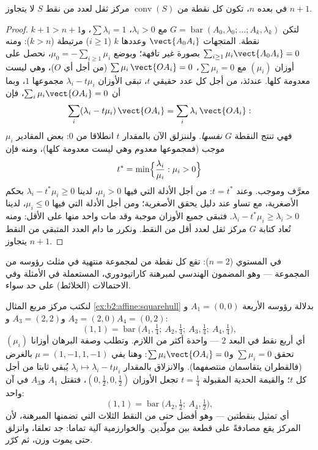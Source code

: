 \begin{theorem}[كاراتيودوري]\label{thm:b2:affine:caratheodory}
في  بعده $n$، تكون كل نقطة من $\operatorname{conv}(S)$ مركز ثقل لعدد من
نقط $S$ لا يتجاوز $n + 1$.
\end{theorem}

\begin{proof}
لتكن $G = \operatorname{bar}(A_0, \lambda_0; \dots; A_k, \lambda_k)$ مع $\lambda_i > 0$، $\sum\lambda_i = 1$، و$k + 1 > n + 1$ نقطة. المتجهات $\vect{A_0A_i}$ وعددها
$k$ ($i \geq 1$) مرتبطة ($k > n$): ومنه $\sum_{i\geq1}\mu_i \vect{A_0A_i} = 0$ بصورة غير تافهة؛
وبوضع $\mu_0 = -\sum_{i\geq1}\mu_i$، نحصل على أوزان $(\mu_i)$ مع $\sum\mu_i = 0$، $\sum \mu_i\,\vect{OA_i} = 0$ (من أجل أي
$O$)، وهي ليست معدومة كلها. عندئذ، من أجل كل عدد حقيقي $t$،
تبقى الأوزان $\lambda_i - t\mu_i$ مجموعها $1$، وبما أن $\sum_i\mu_i\vect{OA_i} = 0$، فإن
\[
\sum_i(\lambda_i - t\mu_i)\,\vect{OA_i}
= \sum_i\lambda_i\,\vect{OA_i} :
\]
فهي تنتج النقطة $G$ \emph{نفسها}. ولننزلق الآن بالمقدار $t$
انطلاقا من $0$: بعض المقادير $\mu_i$ موجب (فمجموعها معدوم وهي
ليست معدومة كلها)، ومنه فإن
\[
t^* = \min\Bigl\{\frac{\lambda_i}{\mu_i} : \mu_i > 0\Bigr\}
\]
معرَّف وموجب. وعند $t = t^*$: من أجل الأدلة التي فيها $\mu_i > 0$، لدينا
$\lambda_i - t^*\mu_i \geq 0$ بحكم الأصغرية، مع تساو عند دليل يحقق الأصغرية؛ ومن أجل الأدلة
التي فيها $\mu_i
\leq 0$، لدينا $\lambda_i - t^*\mu_i \geq \lambda_i > 0$. فتبقى جميع الأوزان موجبة وقد مات
واحد منها على الأقل: ومنه تُعاد كتابة $G$ مركز ثقل لعدد أقل من
النقط. ونكرر ما دام العدد المتبقي من النقط يتجاوز $n + 1$.
\end{proof}

\begin{example}
في المستوي ($n = 2$): تقع كل نقطة من  لمجموعة منتهية في
مثلث رؤوسه من المجموعة --- وهو المضمون الهندسي لمبرهنة كاراتيودوري،
المستعملة في الأمثلة وفي الاحتمالات (الخلائط) على حد سواء.
\end{example}

\begin{example}\label{ex:b2:affine:caratheodoryrun}
لنكتب مركز مربع المثال \cref{ex:b2:affine:squarehull} بدلالة رؤوسه الأربعة $A_1 =
(0,0)$ و$A_2 = (2,0)$
و$A_3 = (2,2)$ و$A_4 = (0,2)$:
\[
(1,1) = \operatorname{bar}\bigl(A_1, \tfrac14;\ A_2,
\tfrac14;\ A_3, \tfrac14;\ A_4, \tfrac14\bigr),
\]
أي أربع نقط في البعد $2$ --- واحدة أكثر من اللازم. وتطلب وصفة
البرهان أوزانا $(\mu_i)$ تحقق $\sum\mu_i = 0$ و$\sum\mu_i\vect{OA_i} = 0$: وهنا يفي $\mu = (1, -1, 1, -1)$ بالغرض
(فالقطران يتقاسمان منتصفهما). والانزلاق بالمقدار $\lambda_i
\mapsto \lambda_i - t\mu_i$ يُبقي  ثابتا من أجل كل $t$؛ والقيمة الحدية المقبولة $t = \frac14$ تجعل
الأوزان $(0, \tfrac12, 0, \tfrac12)$، فتقتل $A_1$ و$A_3$ في آن واحد:
\[
(1,1) = \operatorname{bar}\bigl(A_2, \tfrac12;\ A_4,
\tfrac12\bigr),
\]
أي تمثيل بنقطتين --- وهو أفضل حتى من النقط الثلاث التي تضمنها
المبرهنة، لأن المركز يقع مصادفةً على قطعة بين مولّدين. والخوارزمية
آلية تماما: جد تعلقا، وانزلق حتى يموت وزن، ثم كرّر.
\end{example}

